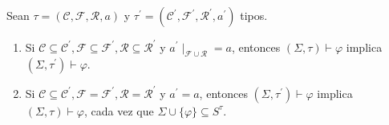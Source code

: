  \begin{lemma}
    \PN Sean $\tau = (\mathcal{C}, \mathcal{F}, \mathcal{R}, a)$ y $\tau^{\prime} = (\mathcal{C}^{\prime},
    \mathcal{F}^{\prime}, \mathcal{R}^{\prime}, a^{\prime})$ tipos.
    \begin{enumerate}
      \item Si $\mathcal{C} \subseteq \mathcal{C}^{\prime}, \mathcal{F} \subseteq \mathcal{F}^{\prime}, \mathcal{R}
      \subseteq \mathcal{R}^{\prime}$ y $a^{\prime}\mid_{\mathcal{F} \cup \mathcal{R}} = a$, entonces $(\Sigma, \tau)
      \vdash \varphi$ implica $(\Sigma, \tau^{\prime}) \vdash \varphi$.
      \item Si $\mathcal{C} \subseteq \mathcal{C}^{\prime}, \mathcal{F} = \mathcal{F}^{\prime}, \mathcal{R} =
      \mathcal{R}^{\prime}$ y $a^{\prime} = a$, entonces $(\Sigma, \tau^{\prime}) \vdash \varphi$ implica $(\Sigma,
      \tau) \vdash \varphi$, cada vez que $\Sigma \cup \{\varphi\} \subseteq S^{\tau}$.
    \end{enumerate}
  \end{lemma}
